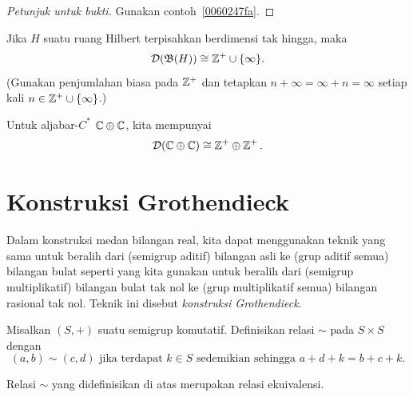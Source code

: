 \begin{proof}[\emph{Petunjuk untuk bukti}] Gunakan contoh~\ref{0060247fa}. \ns
\end{proof}

\begin{exam}\label{0060424} Jika $H$ suatu ruang Hilbert terpisahkan berdimensi tak hingga, maka %
   \[ \mathcal{D}(\mathfrak{B}(H)) \cong \mathbb{Z}^+ \cup \{\infty\}. \]
(Gunakan penjumlahan biasa pada $\mathbb{Z}^+$ dan tetapkan $n + \infty = \infty + n = \infty$ setiap kali $n
\in \mathbb{Z}^+ \cup \{\infty\}$.)
\end{exam}

\begin{exam}\label{0060427} Untuk aljabar-$C^*$ $\mathbb{C} \oplus \mathbb{C}$, kita mempunyai
   \[ \mathcal{D}(\mathbb{C} \oplus \mathbb{C}) \cong \mathbb{Z}^+ \oplus \mathbb{Z}^+\,. \]
\end{exam}


























\section{Konstruksi Grothendieck}
Dalam konstruksi medan bilangan real, kita dapat menggunakan teknik yang sama untuk beralih dari (semigrup aditif) bilangan asli ke
(grup aditif semua) bilangan bulat seperti yang kita gunakan untuk beralih dari (semigrup multiplikatif) bilangan bulat tak nol ke (grup multiplikatif
semua) bilangan rasional tak nol. Teknik ini disebut \emph{konstruksi Grothendieck}.

\begin{defn}\label{0062111} Misalkan $(S,+)$ suatu semigrup komutatif. Definisikan relasi
$\sim$ pada $S \times S$ dengan
   \[ (a,b) \sim (c,d) \text{ jika terdapat $k \in S$ sedemikian sehingga } a + d + k = b + c + k. \]
\end{defn}

\begin{prop}\label{0062114} Relasi $\sim$ yang didefinisikan di atas merupakan relasi ekuivalensi.
\end{prop}

